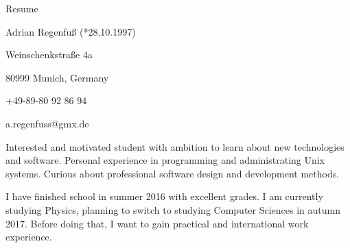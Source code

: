 \documentclass[11pt,a4paper]{article}
\begin{document}
\thispagestyle{empty}
\pagestyle{empty}

{\bf\centerline{{\huge Resume}}}
\vspace{6pt}

\centerline{Adrian Regenfuß (*28.10.1997)}
\centerline{Weinschenkstraße 4a}
\centerline{80999 Munich, Germany}
\centerline{+49-89-80 92 86 94}
\centerline{a.regenfuss@gmx.de}

\vspace{5pt}

Interested and motivated student with ambition to learn
about new technologies and software. Personal experience in programming
and administrating Unix systems. Curious about professional software
design and development methods.

I have finished school in summer 2016 with excellent grades. I am currently studying Physics, planning to switch to
studying Computer Sciences in autumn 2017. Before doing that, I want to gain practical
and international work experience.
\end{document}
